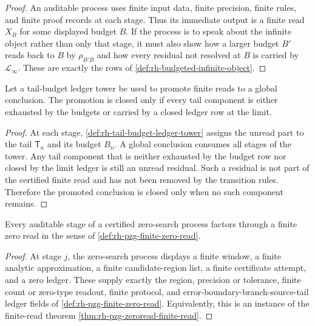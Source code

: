 \begin{proof}
An auditable process uses finite input data, finite precision, finite
rules, and finite proof records at each stage.  Thus its immediate
output is a finite read $X_B$ for some displayed budget $B$.  If the
process is to speak about the infinite object rather than only that
stage, it must also show how a larger budget $B'$ reads back to $B$ by
$\rho_{B'B}$ and how every residual not resolved at $B$ is carried by
$\mathcal L_{\infty}$.  These are exactly the rows of
\autoref{def:rh-budgeted-infinite-object}.
\end{proof}

\begin{theorem}
\label{thm:rh-global-closure-requires-budget-exhaustion-ledger-closure}
Let a tail-budget ledger tower be used to promote finite reads to a
global conclusion.  The promotion is closed only if every tail component
is either exhausted by the budgets or carried by a closed ledger row at
the limit.
\end{theorem}

\begin{proof}
At each stage, \autoref{def:rh-tail-budget-ledger-tower} assigns the
unread part to the tail $\mathsf T_n$ and its budget $B_n$.  A global
conclusion consumes all stages of the tower.  Any tail component that is
neither exhausted by the budget row nor closed by the limit ledger is
still an unread residual.  Such a residual is not part of the certified
finite read and has not been removed by the transition rules.  Therefore
the promoted conclusion is closed only when no such component remains.
\end{proof}

\begin{theorem}
\label{thm:rh-zero-search-factors-through-finite-reads}
Every auditable stage of a certified zero-search process factors through
a finite zero read in the sense of
\autoref{def:rh-pzg-finite-zero-read}.
\end{theorem}

\begin{proof}
At stage $j$, the zero-search process displays a finite window, a finite
analytic approximation, a finite candidate-region list, a finite
certificate attempt, and a zero ledger.  These supply exactly the region,
precision or tolerance, finite count or zero-type readout, finite
protocol, and error-boundary-branch-source-tail ledger fields of
\autoref{def:rh-pzg-finite-zero-read}.  Equivalently, this is an instance
of the finite-read theorem
\autoref{thm:rh-pzg-zeroread-finite-read}.
\end{proof}

